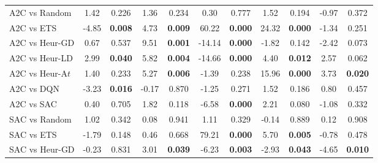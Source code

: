 \begin{tabular}{lcccccccccc}
	\midrule 
	A2C vs Random    & 1.42           & 0.226                  & 1.36           & 0.234                  & 0.30           & 0.777                  & 1.52           & 0.194                  & -0.97          & 0.372                  \\
	A2C vs ETS       & -4.85          & \textbf{0.008}         & 4.73           & \textbf{0.009}         & 60.22          & \textbf{0.000}         & 24.32          & \textbf{0.000}         & -1.34          & 0.251                  \\
	A2C vs Heur-GD   & 0.67           & 0.537                  & 9.51           & \textbf{0.001}         & -14.14         & \textbf{0.000}         & -1.82          & 0.142                  & -2.42          & 0.073                  \\
	A2C vs Heur-LD   & 2.99           & \textbf{0.040}         & 5.82           & \textbf{0.004}         & -14.66         & \textbf{0.000}         & 4.40           & \textbf{0.012}         & 2.57           & 0.062                  \\
	A2C vs Heur-A$t$  & 1.40           & 0.233                  & 5.27           & \textbf{0.006}         & -1.39          & 0.238                  & 15.96          & \textbf{0.000}         & 3.73           & \textbf{0.020}         \\
	A2C vs DQN       & -3.23          & \textbf{0.016}         & -0.17          & 0.870                  & -1.25          & 0.271                  & 1.52           & 0.186                  & 0.80           & 0.457                  \\
	A2C vs SAC       & 0.40           & 0.705                  & 1.82           & 0.118                  & -6.58          & \textbf{0.000}         & 2.21           & 0.080                  & -1.08          & 0.332                  \\
	\midrule 
	SAC vs Random    & 1.02           & 0.342                  & 0.08           & 0.941                  & 1.11           & 0.329                  & -0.14          & 0.889                  & 0.12           & 0.908                  \\
	SAC vs ETS       & -1.79          & 0.148                  & 0.46           & 0.668                  & 79.21          & \textbf{0.000}         & 5.70           & \textbf{0.005}         & -0.78          & 0.478                  \\
	SAC vs Heur-GD   & -0.23          & 0.831                  & 3.01           & \textbf{0.039}         & -6.23          & \textbf{0.003}         & -2.93          & \textbf{0.043}         & -4.65          & \textbf{0.010}         \\

\end{tabular}

